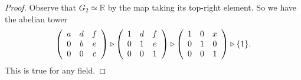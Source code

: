 \begin{xmpl}
\begin{enumerate}
{\begin{proof}
        Observe that $G_2 \simeq \mathbb{R}$ by the map taking its
        top-right element. So we have the abelian tower
        $$
        \left(\begin{array}{c c c}
          a & d & f \\ 0 & b & e \\ 0 & 0 & c
        \end{array}\right)
        \triangleright
        \left(\begin{array}{c c c}
          1 & d & f \\ 0 & 1 & e \\ 0 & 0 & 1
        \end{array}\right)
        \triangleright
        \left(\begin{array}{c c c}
          1 & 0 & x \\ 0 & 1 & 0 \\ 0 & 0 & 1
        \end{array}\right)
        \triangleright \{ 1 \}.
        $$
        This is true for any field.
      \end{proof}
    }
\end{enumerate}
\end{xmpl}


